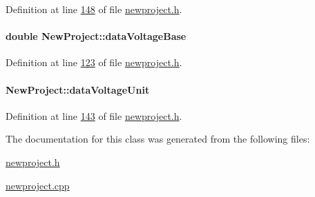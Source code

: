 Definition at line \hyperlink{newproject_8h_source_l00148}{148} of file \hyperlink{newproject_8h_source}{newproject.\+h}.

\hypertarget{class_new_project_a21dc54f9c0c8a59ca33eaa42cb9f9352}{}
\paragraph[{data\+Voltage\+Base}]{\setlength{\rightskip}{0pt plus 5cm}double New\+Project\+::data\+Voltage\+Base}\label{class_new_project_a21dc54f9c0c8a59ca33eaa42cb9f9352}


Definition at line \hyperlink{newproject_8h_source_l00123}{123} of file \hyperlink{newproject_8h_source}{newproject.\+h}.

\hypertarget{class_new_project_a04187cd16b01b80dcdef9107e4c83a28}{}
\paragraph[{data\+Voltage\+Unit}]{ New\+Project\+::data\+Voltage\+Unit}\label{class_new_project_a04187cd16b01b80dcdef9107e4c83a28}


Definition at line \hyperlink{newproject_8h_source_l00143}{143} of file \hyperlink{newproject_8h_source}{newproject.\+h}.



The documentation for this class was generated from the following files\+:\begin{DoxyCompactItemize}
\item 
\hyperlink{newproject_8h}{newproject.\+h}\item 
\hyperlink{newproject_8cpp}{newproject.\+cpp}\end{DoxyCompactItemize}

